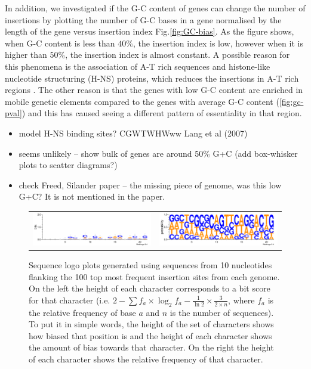 \documentclass[12pt,letterpaper]{article}
\begin{document}
In addition, we investigated if the G-C content of genes can change the number of insertions by plotting the number of G-C bases in a gene normalised by the length of the gene versus insertion index Fig.\@  \ref{fig:GC-bias}. As the figure shows, when G-C content is less than $40\%$, the insertion index is low, however when it is higher than $50\%$, the insertion index is almost constant. A possible reason for this phenomena is the association of A-T rich sequences and histone-like nucleotide structuring (H-NS) proteins, which reduces the insertions in A-T rich regions \cite{kimura_nucleoid_2016}. The other reason is that the genes with low G-C content are enriched in mobile genetic elements compared to the genes with average G-C content (\ref{fig:gc-pval}) and this has caused seeing a different pattern of essentiality in that region.

\begin{itemize}
\item model H-NS binding sites? CGWTWHWww Lang et al (2007)
\item seems unlikely -- show bulk of genes are around 50\% G+C (add box-whisker plots to scatter diagrams?)
\item check Freed, Silander paper -- the missing piece of genome, was this low G+C? It is not mentioned in the paper.
\end{itemize}

\begin{figure}
\begin{tabular}{c c}
\includegraphics[scale=0.55]{100logo-bits.pdf}&
\includegraphics[scale=0.55]{100logo-prob.pdf}
\end{tabular}
\caption{Sequence logo plots generated using sequences from 10 nucleotides flanking the 100 top most frequent insertion sites from each genome. On the left the height of each character corresponds to a bit score for that character (i.e. $2-\sum f_a\times\log_2f_a-\frac{1}{\ln2}\times\frac{3}{2\times n}$, where $f_a$ is the relative frequency of base $a$ and $n$ is the number of sequences). To put it in simple words, the height of the set of characters shows how biased that position is and the height of each character shows the amount of bias towards that character. On the right the height of each character shows the relative frequency of that character.}
\label{fig:logos}
\end{figure}
\end{document}
